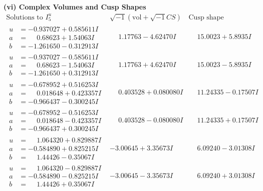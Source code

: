 \documentclass[1p]{elsarticle_modified}
\theoremstyle{definition}
\newcommand{\I}{\sqrt{-1}}
\begin{document}
\newpage\flushleft \textbf{(vi) Complex Volumes and Cusp Shapes}
$$\begin{array}{c|c|c}  
\text{Solutions to }I^u_{5}& \I (\text{vol} + \sqrt{-1}CS) & \text{Cusp shape}\\
 \hline 
\begin{aligned}
u &= -0.937027 + 0.585611 I \\
a &= \phantom{-}0.68623 + 1.54063 I \\
b &= -1.261650 - 0.312913 I\end{aligned}
 & \phantom{-}1.17763 - 4.62470 I & \phantom{-}15.0023 + 5.8935 I \\ \hline\begin{aligned}
u &= -0.937027 - 0.585611 I \\
a &= \phantom{-}0.68623 - 1.54063 I \\
b &= -1.261650 + 0.312913 I\end{aligned}
 & \phantom{-}1.17763 + 4.62470 I & \phantom{-}15.0023 - 5.8935 I \\ \hline\begin{aligned}
u &= -0.678952 + 0.516253 I \\
a &= \phantom{-}0.018648 + 0.423357 I \\
b &= -0.966437 - 0.300245 I\end{aligned}
 & \phantom{-}0.403528 + 0.080080 I & \phantom{-}11.24335 - 0.17507 I \\ \hline\begin{aligned}
u &= -0.678952 - 0.516253 I \\
a &= \phantom{-}0.018648 - 0.423357 I \\
b &= -0.966437 + 0.300245 I\end{aligned}
 & \phantom{-}0.403528 - 0.080080 I & \phantom{-}11.24335 + 0.17507 I \\ \hline\begin{aligned}
u &= \phantom{-}1.064320 + 0.829887 I \\
a &= -0.584890 + 0.825215 I \\
b &= \phantom{-}1.44426 - 0.35067 I\end{aligned}
 & -3.00645 + 3.35673 I & \phantom{-}6.09240 - 3.01308 I \\ \hline\begin{aligned}
u &= \phantom{-}1.064320 - 0.829887 I \\
a &= -0.584890 - 0.825215 I \\
b &= \phantom{-}1.44426 + 0.35067 I\end{aligned}
 & -3.00645 - 3.35673 I & \phantom{-}6.09240 + 3.01308 I \\ \hline\begin{aligned}

\end{aligned}
\end{array}$$
\end{document}
